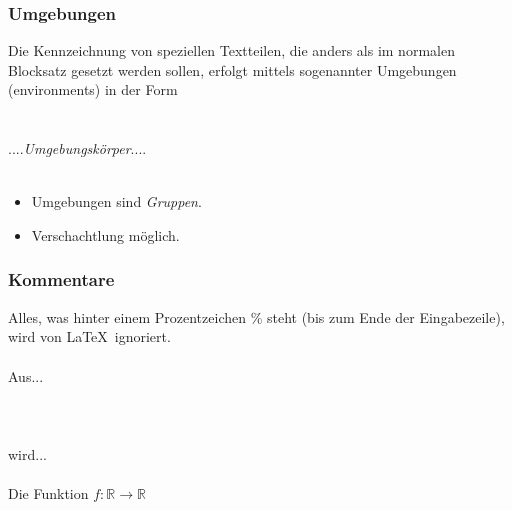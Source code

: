 \subsubsection{Umgebungen}
Die Kennzeichnung von speziellen Textteilen, die anders als im normalen Blocksatz gesetzt werden sollen, erfolgt mittels sogenannter Umgebungen (environments) in der Form\\
~\\
\hspace*{0.5cm}	\\
\hspace*{1cm}	 ....\textit{Umgebungskörper}.... \\
\hspace*{0.5cm}	 \\
\begin{itemize}
	\item Umgebungen sind \textit{Gruppen}.
	\item Verschachtlung möglich.
\end{itemize}

%
\subsubsection{Kommentare}
Alles, was hinter einem Prozentzeichen \% steht (bis zum Ende der Eingabezeile), wird von \LaTeX\ ignoriert.\\~\\
Aus...\\~\\
\hspace*{0.5cm} 
~\\~\\
wird...\\~\\
\hspace*{0.5cm} Die Funktion $f\colon \mathbb{R}\to\mathbb{R}$
~\\~\\
%
%

